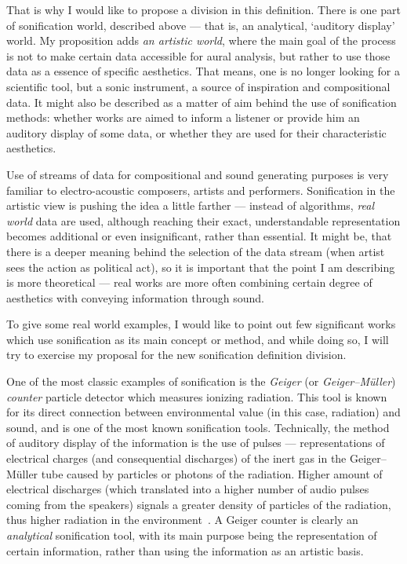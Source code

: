 \documentclass[12pt,a4paper,oneside]{report}
\begin{document}
That is why I would like to propose a division in this definition. There is one part of sonification world, described above --- that is, an analytical, `auditory display' world. My proposition adds \emph{an artistic world}, where the main goal of the process is not to make certain data accessible for aural analysis, but rather to use those data as a essence of specific aesthetics. That means, one is no longer looking for a scientific tool, but a sonic instrument, a source of inspiration and compositional data. It might also be described as a matter of aim behind the use of sonification methods: whether works are aimed to inform a listener or provide him an auditory display of some data, or whether they are used for their characteristic aesthetics.

Use of streams of data for compositional and sound generating purposes is very familiar to electro-acoustic composers, artists and performers. Sonification in the artistic view is pushing the idea a little farther --- instead of algorithms, \emph{real world} data are used, although reaching their exact, understandable representation becomes additional or even insignificant, rather than essential. It might be, that there is a deeper meaning behind the selection of the data stream (when artist sees the action as political act), so it is important that the point I am describing is more theoretical --- real works are more often combining certain degree of aesthetics with conveying information through sound.

To give some real world examples, I would like to point out few significant works which use sonification as its main concept or method, and while doing so, I will try to exercise my proposal for the new sonification definition division.

One of the most classic examples of sonification is the \emph{Geiger} (or \emph{Geiger–Müller}) \emph{counter} particle detector which measures ionizing radiation. This tool is known for its direct connection between environmental value (in this case, radiation) and sound, and is one of the most known sonification tools. Technically, the method of auditory display of the information is the use of pulses --- representations of electrical charges (and consequential discharges) of the inert gas in the Geiger–Müller tube caused by particles or photons of the radiation. Higher amount of electrical discharges (which translated into a higher number of audio pulses coming from the speakers) signals a greater density of particles of the radiation, thus higher radiation in the environment~\cite{Knoll2010}. A Geiger counter is clearly an \emph{analytical} sonification tool, with its main purpose being the representation of certain information, rather than using the information as an artistic basis.
\end{document}
